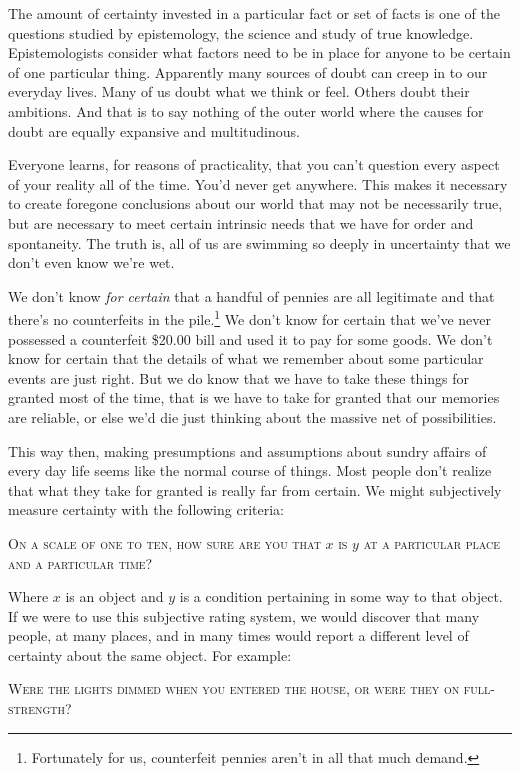 \documentclass[a4paper,oneside]{article}
\begin{document}
\begin{multicols}{2}
The amount of certainty invested in a particular fact or set of facts is one of the questions studied by epistemology, the science and study of true knowledge. Epistemologists consider what factors need to be in place for anyone to be certain of one particular thing. Apparently many sources of doubt can creep in to our everyday lives. Many of us doubt what we think or feel. Others doubt their ambitions. And that is to say nothing of the outer world where the causes for doubt are equally expansive and multitudinous.

Everyone learns, for reasons of practicality, that you can't question every aspect of your reality all of the time. You'd never get anywhere. This makes it necessary to create foregone conclusions about our world that may not be necessarily true, but are necessary to meet certain intrinsic needs that we have for order and spontaneity. The truth is, all of us are swimming so deeply in uncertainty that we don't even know we're wet.

We don't know \textit{for certain} that a handful of pennies are all legitimate and that there's no counterfeits in the pile.\footnote{Fortunately for us, counterfeit pennies aren't in all that much demand.} We don't know for certain that we've never possessed a counterfeit \$20.00 bill and used it to pay for some goods. We don't know for certain that the details of what we remember about some particular events are just right. But we do know that we have to take these things for granted most of the time, that is we have to take for granted that our memories are reliable, or else we'd die just thinking about the massive net of possibilities.

This way then, making presumptions and assumptions about sundry affairs of every day life seems like the normal course of things. Most people don't realize that what they take for granted is really far from certain. We might subjectively measure certainty with the following criteria:

\textsc{On a scale of one to ten, how sure are you that $x$ is $y$ at a particular place and a particular time?} 

Where $x$ is an object and $y$ is a condition pertaining in some way to that object. If we were to use this subjective rating system, we would discover that many people, at many places, and in many times would report a different level of certainty about the same object. For example:

\textsc{Were the lights dimmed when you entered the house, or were they on full-strength?}


\end{multicols}
\end{document}
